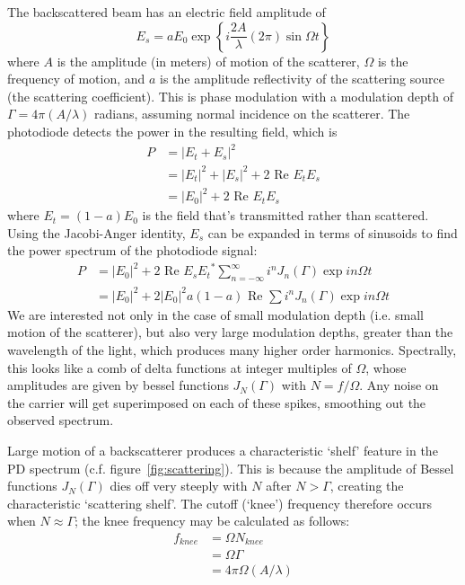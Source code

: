 The backscattered beam has an electric field amplitude of
%
\begin{equation}
E_s = a E_0 \exp\left\{ i \frac{2 A}{\lambda} (2 \pi) \sin \Omega t \right\}
\end{equation}
%
where $A$ is the amplitude (in meters) of motion of the scatterer,
$\Omega$ is the frequency of motion, and $a$ is the amplitude
reflectivity of the scattering source (the scattering
coefficient). This is phase modulation with a modulation depth of
%
$\Gamma = 4 \pi (A/\lambda)$
%
radians, assuming normal incidence on the scatterer.  The photodiode
detects the power in the resulting field, which is
%
\begin{align}
P &= |E_t + E_s|^2 \\
  &= |E_t|^2 + |E_s|^2 + 2 \text{ Re } E_t E_s \\
  &= |E_0|^2 + 2 \text{ Re } E_t E_s
\end{align}
where $E_t = (1 - a) E_0$ is the field that's transmitted rather than
scattered.
%
Using the Jacobi-Anger identity, $E_s$ can be expanded in terms of
sinusoids to find the power spectrum of the photodiode signal:
%
\begin{align}
P &= |E_0|^2 + 2 \text{ Re } E_s {E_t}^* \sum_{n=-\infty}^{\infty} i^n J_n(\Gamma) \exp{i n \Omega t} \\
  &= |E_0|^2 + 2 |E_0|^2 a (1 - a) \text{ Re } \sum i^n J_n(\Gamma) \exp{i n \Omega t} 
\end{align}
%
We are interested not only in the case of small modulation depth
(i.e. small motion of the scatterer), but also very large modulation
depths, greater than the wavelength of the light, which produces many
higher order harmonics.  Spectrally, this looks like a comb of delta
functions at integer multiples of $\Omega$, whose amplitudes are given
by bessel functions $J_N(\Gamma)$ with $N=f/\Omega$.  Any noise on the
carrier will get superimposed on each of these spikes, smoothing out
the observed spectrum.

Large motion of a backscatterer produces a characteristic `shelf'
feature in the PD spectrum (c.f. figure~\ref{fig:scattering}).  This
is because the amplitude of Bessel functions $J_N(\Gamma)$ dies off
very steeply with $N$ after $N>\Gamma$, creating the characteristic
`scattering shelf'.  The cutoff (`knee') frequency therefore occurs
when $N \approx \Gamma$; the knee frequency may be calculated as
follows:
%
\begin{align}
f_{knee} & = \Omega N_{knee} \\
       & = \Omega \Gamma \\
       & = 4 \pi \Omega (A / \lambda)
\end{align}

